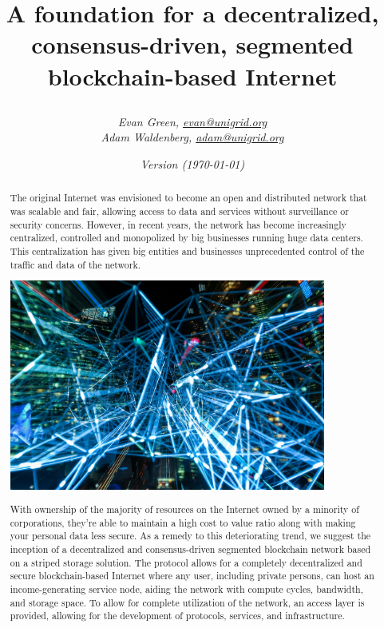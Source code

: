 \documentclass{article}
\author{\textit{Evan Green, \href{mailto:evan@unigrid.org}{evan@unigrid.org}}\\
\textit{Adam Waldenberg, \href{mailto:adam@unigrid.org}{adam@unigrid.org}}}
\affil{The Unigrid Foundation}
\title{
	\makebox[\textwidth]{\hspace{600pt}\tikz \fill[orange] (18,1.4) rectangle (0,0);}
	\vspace{60pt}
	\begin{center}
		
	\end{center}
	\vspace{35pt}
	A foundation for a decentralized, consensus-driven, segmented blockchain-based Internet
	\vspace{10pt}
}
\date{\emph{Version \gitRel\hspace{5pt}(\today)}}
\begin{document}
\setlength{\headheight}{40pt}

\clearpage\maketitle
\thispagestyle{empty}
\newpage
\vspace*{+40pt}
\begin{abstract}
\noindent The original Internet was envisioned to become an open and distributed network that was scalable and fair, allowing access to data and services without surveillance or security concerns. However, in recent years, the network has become increasingly centralized, controlled and monopolized by big businesses running huge data centers. This centralization has given big entities and businesses unprecedented control of the traffic and data of the network.

\begin{mdframed}[style=textimage]
	\includegraphics[width=295pt]{lights}
\end{mdframed}

\noindent With ownership of the majority of resources on the Internet owned by a minority of corporations, they're able to maintain a high cost to value ratio along with making your personal data less secure. As a remedy to this deteriorating trend, we suggest the inception of a decentralized and consensus-driven segmented blockchain network based on a striped storage solution. The protocol allows for a completely decentralized and secure blockchain-based Internet where any user, including private persons, can host an income-generating service node, aiding the network with compute cycles, bandwidth, and storage space. To allow for complete utilization of the network, an access layer is provided, allowing for the development of protocols, services, and infrastructure.

\end{abstract}
\end{document}
